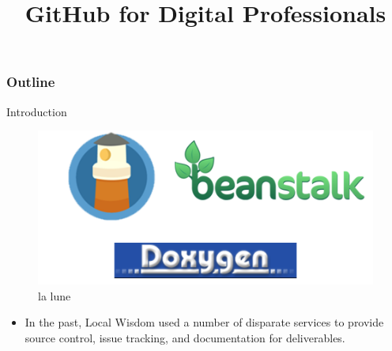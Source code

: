 \documentclass[ignorenonframetext,,aspectratio=169,14pt]{beamer}
\title{GitHub for Digital Professionals}
\institute[]
{
  
}
\begin{document}
\frame{\titlepage}

\begin{frame}
\frametitle{Outline}
\tableofcontents
\end{frame}

\begin{frame}{Introduction}

\begin{figure}[htbp]
\centering
\includegraphics{img/logos.png}
\caption{la lune}
\end{figure}

\begin{itemize}
\itemsep1pt\parskip0pt
\item
  In the past, Local Wisdom used a number of disparate services to
  provide source control, issue tracking, and documentation for
  deliverables.
\end{itemize}

\end{frame}
\end{document}
